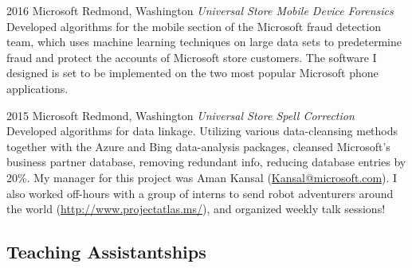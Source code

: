 \documentclass{friggeri-cv}
\begin{document}
\begin{entrylist}


\entry
{2016}
{Microsoft}
{Redmond, Washington}
{\emph{Universal Store Mobile Device Forensics} \\
Developed algorithms for the mobile section of the Microsoft fraud detection team, which uses machine learning techniques on large data sets to predetermine fraud and protect the accounts of Microsoft store customers. The software I designed is set to be implemented on the two most popular Microsoft phone applications. }


\entry
{2015}
{Microsoft}
{Redmond, Washington}
{\emph{Universal Store Spell Correction} \\
Developed algorithms for data linkage. Utilizing various data-cleansing methods together with the Azure and Bing data-analysis packages, cleansed Microsoft's business partner database, removing redundant info, reducing database entries by 20\%. My manager for this project was Aman Kansal (\href{mailto:Kansal@microsoft.com}{Kansal@microsoft.com}). I also worked off-hours with a group of interns to send robot adventurers around the world (\href{http://www.projectatlas.ms/}{http://www.projectatlas.ms/}), and organized weekly talk sessions!}

\end{entrylist}

\pagebreak[4]

\subsection{Teaching Assistantships}
\end{document}
